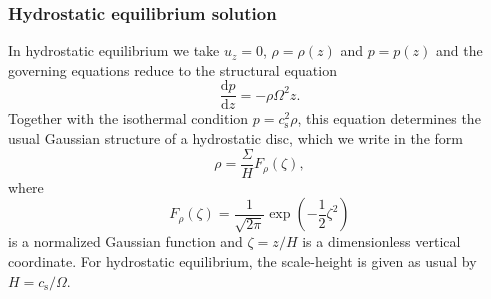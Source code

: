 \documentclass[fleqn,usenatbib]{mnras}
\newcommand{\dd}{\mathrm{d}}
\begin{document}
\subsubsection{Hydrostatic equilibrium solution}
In hydrostatic equilibrium we take $u_z = 0$, $\rho = \rho(z)$ and $p=p(z)$ and the governing equations reduce to the structural equation
\begin{equation}
    \frac{\dd p}{\dd z} = - \rho \Omega^2 z.
    \label{EQUATION_1DTheoryHydrostaticEquilibrium}
\end{equation}
Together with the isothermal condition $p=c_\text{s}^2\rho$, this equation determines the usual Gaussian structure of a hydrostatic disc, which we write in the form
\begin{equation}
  \rho=\frac{\Sigma}{H}F_{\rho}(\zeta),
\label{rho_dimensionless}
\end{equation}
where
\begin{equation}
  F_{\rho}(\zeta)=\frac{1}{\sqrt{2\pi}}\exp\left(-\frac{1}{2}\zeta^2\right)\label{EQUATION_GaussianDimensionlessDensity}
\end{equation}
is a normalized Gaussian function and $\zeta=z/H$ is a dimensionless vertical coordinate. For hydrostatic equilibrium, the scale-height is given as usual by $H=c_\text{s}/\Omega$.
\end{document}
